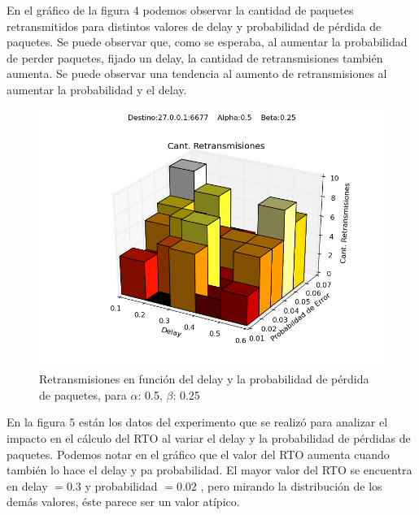 En el gráfico de la figura $4$ podemos observar la cantidad de paquetes retransmitidos para distintos valores de delay y probabilidad de pérdida de paquetes. Se puede observar que, como se esperaba, al aumentar la probabilidad de perder paquetes, fijado un delay, la cantidad de retransmisiones también aumenta. Se puede observar una tendencia al aumento de retransmisiones al aumentar la probabilidad y el delay.

\begin{figure}[H]
  \centering	
	\includegraphics[scale=0.5]{../analisis/graficos_tablas/graficos_en_funcion_de_delay_probaerror/0.5-0.25_2/retransmisiones.png}
  \caption{Retransmisiones en funci\'on del delay y la probabilidad de pérdida de paquetes, para $\alpha$: 0.5, $\beta$: 0.25}
	\label{fig:histo-src-sitiotrabajo}
\end{figure}

En la figura $5$ están los datos del experimento que se realizó para analizar el impacto en el cálculo del RTO al variar el delay y la probabilidad de pérdidas de paquetes. Podemos notar en el gráfico que el valor del RTO aumenta cuando también lo hace el delay y pa probabilidad. El mayor valor del RTO se encuentra en delay $= 0.3$ y probabilidad $= 0.02$ , pero mirando la distribución de los demás valores, éste parece ser un valor atípico.

